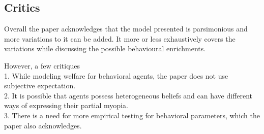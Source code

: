\documentclass{beamer}
\begin{document}
\subsection{Critics}
\begin{frame}{\subsecname}

Overall the paper acknowledges that the model presented is parsimonious and more variations to it can be added. It more or less exhaustively covers the variations while discussing the possible behavioural enrichments. 

However, a few critiques \\
1. While modeling welfare for behavioral agents, the paper does not use subjective expectation. \\
2. It is possible that agents possess heterogeneous beliefs and can have different ways of expressing their partial myopia. \\
3. There is a need for more empirical testing for behavioral parameters, which the paper also acknowledges.


\end{frame}
\end{document}
